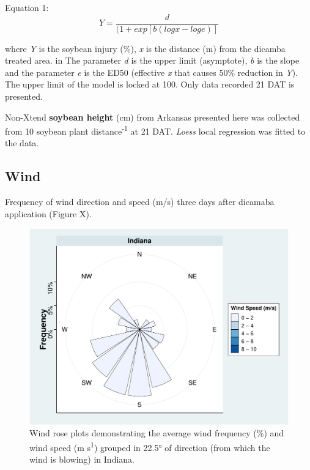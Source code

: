 \documentclass[]{article}
\begin{document}
Equation 1: \[Y= \frac{d}{(1 + exp[b(logx - loge)]} \]

where \emph{Y} is the soybean injury (\%), \emph{x} is the distance (m)
from the dicamba treated area. in The parameter \emph{d} is the upper
limit (asymptote), \emph{b} is the slope and the parameter \emph{e} is
the ED50 (effective \emph{x} that causes 50\% reduction in \emph{Y}).
The upper limit of the model is locked at 100. Only data recorded 21 DAT
is presented.

Non-Xtend \textbf{soybean height} (cm) from Arkansas presented here was
collected from 10 soybean plant distance\textsuperscript{-1} at 21 DAT.
\emph{Loess} local regression was fitted to the data.

\pagebreak
\newpage

\subsection{Wind}\label{wind-1}

Frequency of wind direction and speed (m/s) three days after dicamaba
application (Figure X).

\begin{figure}
\centering
\includegraphics{Report_Dicamba_study_files/figure-latex/unnamed-chunk-23-1.pdf}
\caption{Wind rose plots demonstrating the average wind frequency (\%)
and wind speed (m s\textsuperscript{1}) grouped in 22.5° of direction
(from which the wind is blowing) in Indiana.}
\end{figure}

\pagebreak
\newpage
\end{document}
